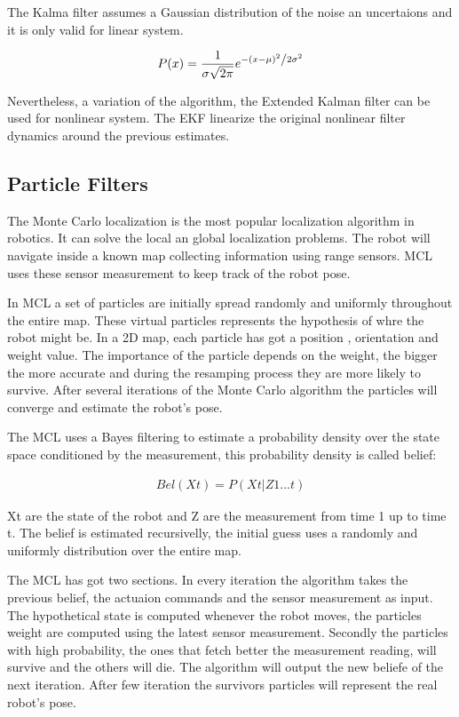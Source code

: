 \documentclass[10pt,journal,compsoc]{IEEEtran}
\begin{document}
The Kalma filter assumes a Gaussian distribution of the noise an uncertaions and it is only valid for linear system.

\begin{align}
P(x) = \frac{1}{{\sigma \sqrt {2\pi } }}e^{{{ - \left( {x - \mu } \right)^2 } \mathord{\left/ {\vphantom {{ - \left( {x - \mu } \right)^2 } {2\sigma ^2 }}} \right. \kern-\nulldelimiterspace} {2\sigma ^2 }}}
\end{align}

Nevertheless, a variation of the algorithm, the Extended Kalman filter can be used for nonlinear system. The EKF linearize the original nonlinear filter dynamics around the previous estimates.

\subsection{Particle Filters}

The Monte Carlo localization is the most popular localization algorithm in robotics. It can solve the local an global localization problems. The robot will navigate inside a known map collecting information using range sensors. MCL uses these sensor measurement to keep track of the robot pose. 

In MCL a set of particles are initially spread randomly and uniformly throughout the entire map. These virtual particles represents the hypothesis of whre the robot might be. In a 2D map, each particle has got a position , orientation and weight value. The importance of the particle depends on the weight, the bigger the more accurate and during the resamping process they are more likely to survive. After several iterations of the Monte Carlo algorithm the particles will converge and estimate the robot's pose.

The MCL uses a Bayes filtering to estimate a probability density over the state space conditioned by the measurement, this probability density is called belief:

\begin{align}
Bel(X{t}) = P(X{t} |Z{1}...{t} )
\end{align}

X{t} are the state of the robot and Z are the measurement from time 1 up to time {t}. The belief is estimated recursivelly, the initial guess uses a randomly and uniformly distribution over the entire map.

The MCL has got two sections. In every iteration the algorithm takes the previous belief, the actuaion commands and the sensor measurement as input. The hypothetical state is computed whenever the robot moves, the particles weight are computed using the latest sensor measurement. Secondly the particles with high probability, the ones that fetch better the measurement reading, will survive and the others will die. The algorithm will output the new beliefe of the next iteration. After few iteration the survivors particles will represent the real robot's pose.
\end{document}
